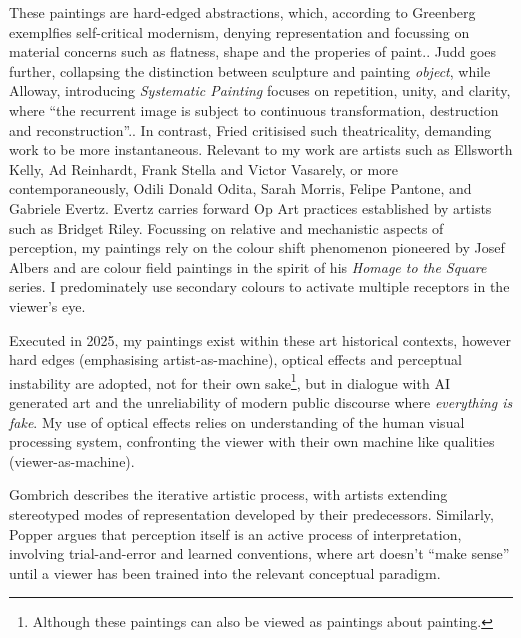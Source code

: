 \documentclass[12pt]{article}
\begin{document}
These paintings are hard-edged abstractions, which, according to
Greenberg exemplfies self-critical modernism, denying representation
and focussing on material concerns such as flatness, shape and the
properies of paint.\cite[p. 85-93]{Greenberg1961}. Judd goes further,
collapsing the distinction between sculpture and painting
\emph{object}\cite{Judd1965}, while Alloway, introducing
\emph{Systematic Painting} focuses on repetition, unity, and clarity,
where ``the recurrent image is subject to continuous transformation,
destruction and reconstruction''.\cite[pp. 18-19]{Alloway1975}. In
contrast, Fried critisised such theatricality, demanding work to be
more instantaneous.\cite[p. 12-23]{Fried1968} Relevant to my work are
artists such as Ellsworth Kelly, Ad Reinhardt, Frank Stella and Victor
Vasarely, or more contemporaneously, Odili Donald Odita, Sarah Morris,
Felipe Pantone, and Gabriele Evertz. Evertz carries forward Op Art
practices\cite{Follin2004EmbodiedVisions,Seitz1965ResponsiveEye}
established by artists such as Bridget
Riley.\cite{Riley2019EyesMind,Riley2019DialoguesOnArt} Focussing on
relative and mechanistic aspects of perception, my paintings rely on
the colour shift phenomenon pioneered by Josef Albers\cite{albers}
and are colour field paintings in the spirit of his \emph{Homage to
  the Square} series. I predominately use secondary colours to
activate multiple receptors in the viewer's
eye.\cite{HurvichJameson1957,Land1977,SchnapfKraftBaylor1987}

Executed in 2025, my paintings exist within these art historical
contexts, however hard edges (emphasising artist-as-machine), 
optical effects and perceptual instability are adopted, not for their
own sake\footnote{Although these paintings can also be viewed as
  paintings about painting.}, but in dialogue with AI generated art
and the unreliability of modern public discourse where \emph{everything is
fake}. My use of optical effects relies on understanding of the human
visual processing system, confronting the viewer with their own
machine like qualities (viewer-as-machine).

Gombrich describes the iterative artistic process, with artists
extending stereotyped modes of representation developed by their
predecessors.\cite[Chapters II, V]{gombrich1960art} Similarly, Popper
argues that perception itself is an active process of interpretation,
involving trial-and-error and learned conventions, where art doesn't
``make sense'' until a viewer has been trained into the relevant
conceptual paradigm.\cite[Chapter 2]{popper1972objective}
\end{document}
